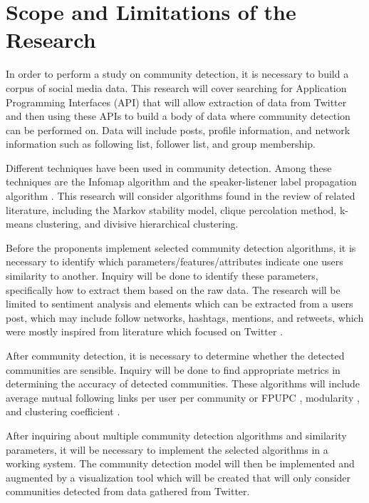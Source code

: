 \section{Scope and Limitations of the Research}
\label{sec:scopelimitations}

In order to perform a study on community detection, it is necessary to build a corpus of social media data. This research will cover searching for Application Programming Interfaces (API) that will allow extraction of data from Twitter and then using these APIs to build a body of data where community detection can be performed on. Data will include posts, profile information, and network information such as following list, follower list, and group membership.

Different techniques have been used in community detection. Among these techniques are the Infomap algorithm and the speaker-listener label propagation algorithm \cite{Deitrick:2013}.  This research will consider algorithms found in the review of related literature, including the Markov stability model, clique percolation method, k-means clustering, and divisive hierarchical clustering.

Before the proponents implement selected community detection algorithms, it is necessary to identify which parameters/features/attributes indicate one user\vtick s similarity to another. Inquiry will be done to identify these parameters, specifically how to extract them based on the raw data. The research will be limited to sentiment analysis and elements which can be extracted from a user\vtick s post, which may include follow networks, hashtags, mentions, and retweets, which were mostly inspired from literature which focused on Twitter \cite{Deitrick:2013,Zhang:2012,Lim:2012:1}. 

After community detection, it is necessary to determine whether the detected communities are sensible. Inquiry will be done to find appropriate metrics in determining the accuracy of detected communities. These algorithms will include average mutual following links per user per community or FPUPC \cite{Zhang:2012}, modularity \cite{Deitrick:2013}, and clustering coefficient \cite{Lim:2012:1}.

After inquiring about multiple community detection algorithms and similarity parameters, it will be necessary to implement the selected algorithms in a working system. The community detection model will then be implemented and augmented by a visualization tool which will be created that will only consider communities detected from data gathered from Twitter.

